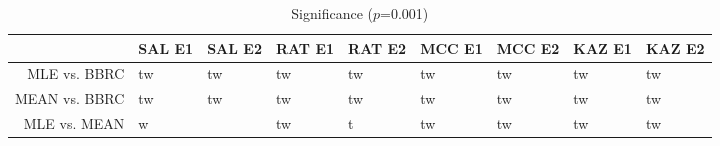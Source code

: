 \begin{table}[t]
\begin{center}
\begin{tabular}{rllllllll}
  \hline
 & SAL E1 & SAL E2 & RAT E1 & RAT E2 & MCC E1 & MCC E2 & KAZ E1 & KAZ E2 \\ 
  \hline
MLE vs. BBRC & tw & tw & tw & tw & tw & tw & tw & tw \\ 
  MEAN vs. BBRC & tw & tw & tw & tw & tw & tw & tw & tw \\ 
  MLE vs. MEAN & w &  & tw & t & tw & tw & tw & tw \\ 
   \hline
\end{tabular}
\caption{Significance ($p$=0.001)}
\label{t:sign}
\end{center}
\end{table}

